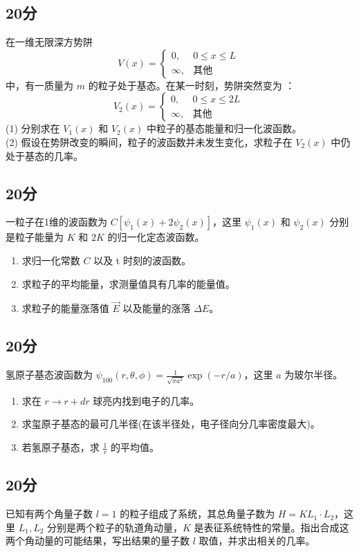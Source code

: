 \subsection{20分}
在一维无限深方势阱
\[
V(x) = 
\begin{cases}
0, & 0 \leq x \leq L \\
\infty, & \text{其他}
\end{cases}~
\]
中，有一质量为 $m$ 的粒子处于基态。在某一时刻，势阱突然变为 ：
\[
V_2(x) = 
\begin{cases}
0, & 0 \leq x \leq 2L \\
\infty, & \text{其他}
\end{cases}~
\]
(1) 分别求在 $V_1(x)$ 和 $V_2(x)$ 中粒子的基态能量和归一化波函数。\\
(2) 假设在势阱改变的瞬间，粒子的波函数并未发生变化，求粒子在 $V_2(x)$ 中仍处于基态的几率。
\subsection{20分}
一粒子在1维的波函数为 $C[\psi_1(x) + 2\psi_2(x)]$，这里 $\psi_1(x)$ 和 $\psi_2(x)$ 分别是粒子能量为 $K$ 和 $2K$ 的归一化定态波函数。
\begin{enumerate}
    \item 求归一化常数 $C$ 以及 t 时刻的波函数。
    \item 求粒子的平均能量，求测量值具有几率的能量值。
    \item 求粒子的能量涨落值 $ \vec E $ 以及能量的涨落 $\Delta E$。
\end{enumerate}
\subsection{20分}
氢原子基态波函数为 $\psi_{100}(r, \theta, \phi) = \frac{1}{\sqrt{\pi a^3}} \exp(-r/a)$，这里 $a$ 为玻尔半径。
\begin{enumerate}
    \item 求在 $r \to r+dr$ 球亮内找到电子的几率。
    \item 求玺原子基态的最可几半径(在该半径处，电子径向分几率密度最大)。
    \item 若氢原子基态，求 $\frac{1}{r}$ 的平均值。
\end{enumerate}
\subsection{20分}
已知有两个角量子数 $l=1$ 的粒子组成了系统，其总角量子数为 $H = K L_1 \cdot L_2$，这里 $L_1, L_2$ 分别是两个粒子的轨道角动量，$K$ 是表征系统特性的常量。指出合成这两个角动量的可能结果，写出结果的量子数 $l$ 取值，并求出相关的几率。
